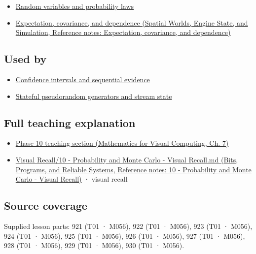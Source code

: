 \hypertarget{appendix-a2360b435383-prerequisites}{}

\begin{itemize}
\tightlist
\item
  \hyperref[appendix-4d0203f7944f]{Random variables and probability laws}
\item
  \href{../05-Spatial-Worlds-Engine-State-and-Simulation/main.pdf\#nameddest=appendix-54c383df9992}{Expectation, covariance, and dependence (Spatial Worlds, Engine State, and Simulation, Reference notes: Expectation, covariance, and dependence)}
\end{itemize}

\subsection{Used by}\label{appendix-a2360b435383-used-by}

\hypertarget{appendix-a2360b435383-used-by}{}

\begin{itemize}
\tightlist
\item
  \hyperref[appendix-c83016554b1e]{Confidence intervals and sequential evidence}
\item
  \hyperref[appendix-e0f7c7e08f3a]{Stateful pseudorandom generators and stream state}
\end{itemize}

\subsection{Full teaching explanation}\label{appendix-a2360b435383-full-teaching-explanation}

\hypertarget{appendix-a2360b435383-full-teaching-explanation}{}

\begin{itemize}
\tightlist
\item
  \href{../02-Mathematics-for-Visual-Computing/main.pdf\#nameddest=02-foundations-ii-ch023-discrete-and-continuous-distribution-families}{Phase 10 teaching section (Mathematics for Visual Computing, Ch. 7)}
\item
  \href{../01-Bits-Programs-and-Reliable-Systems/main.pdf\#nameddest=appendix-cb5af353ef77}{Visual Recall/10 - Probability and Monte Carlo - Visual Recall.md (Bits, Programs, and Reliable Systems, Reference notes: 10 - Probability and Monte Carlo - Visual Recall)} · visual recall
\end{itemize}

\subsection{Source coverage}\label{appendix-a2360b435383-source-coverage}

\hypertarget{appendix-a2360b435383-source-coverage}{}

Supplied lesson parts: 921 (T01 · M056), 922 (T01 · M056), 923 (T01 · M056), 924 (T01 · M056), 925 (T01 · M056), 926 (T01 · M056), 927 (T01 · M056), 928 (T01 · M056), 929 (T01 · M056), 930 (T01 · M056).

